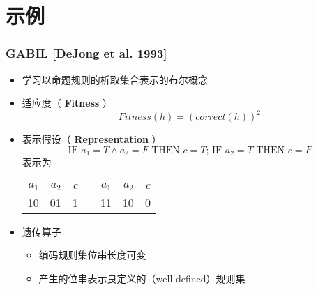 \documentclass{beamer}
\begin{document}
\section{示例}
\label{sec-4}
\begin{frame}
\frametitle{GABIL [DeJong et al. 1993]}
\label{sec-4-1}

\begin{itemize}
\item 学习以命题规则的析取集合表示的布尔概念
\item 适应度（ \textbf{Fitness} ）
  \[ Fitness(h) = (correct(h))^2 \]
\item 表示假设（ \textbf{Representation} ）
   \[\mbox{IF  } a_{1} = T \land a_{2}=F \mbox{\ THEN\ } c = T 
   \mbox{; \ IF  } a_{2} = T  \mbox{\  THEN\  } c = F  \]
    表示为

\begin{center}
\begin{tabular}{rrrlrrr}
 $a_{1}$  &  $a_{2}$  &  $c$  &     &  $a_{1}$  &  $a_{2}$  &  $c$  \\
      10  &       01  &    1  &     &       11  &       10  &    0  \\
\end{tabular}
\end{center}


\item 遗传算子
\begin{itemize}
\item 编码规则集位串长度可变
\item 产生的位串表示良定义的（well-defined）规则集
\end{itemize}
\end{itemize}
\end{frame}
\end{document}
